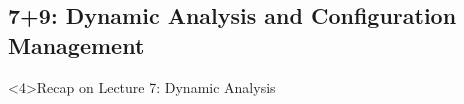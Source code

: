 
\subsection{7+9: Dynamic Analysis and Configuration Management}
\begin{frame}<4>{Recap on Lecture 7: Dynamic Analysis}
	\slideStagesTesting
\end{frame}

